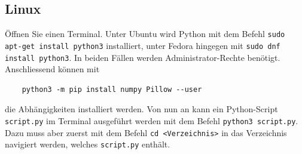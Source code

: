 \documentclass[12pt,a4paper]{article}
\theoremstyle{definition}
\theoremstyle{definition}
\begin{document}
\subsection*{Linux}
Öffnen Sie einen Terminal.
Unter Ubuntu wird Python mit dem Befehl \texttt{sudo apt-get install python3} installiert, unter Fedora hingegen mit \texttt{sudo dnf install python3}.
In beiden Fällen werden Administrator-Rechte benötigt.
Anschliessend können mit
\begin{verbatim}
	python3 -m pip install numpy Pillow --user
\end{verbatim}
die Abhängigkeiten installiert werden.
Von nun an kann ein Python-Script \texttt{script.py} im Terminal ausgeführt werden mit dem Befehl \texttt{python3 script.py}.
Dazu muss aber zuerst mit dem Befehl \texttt{cd <Verzeichnis>} in das Verzeichnis navigiert werden, welches \texttt{script.py} enthält.
\end{document}

